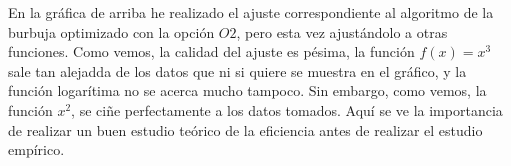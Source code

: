 \documentclass[12pt]{article}
\begin{document}
En la gráfica de arriba he realizado el ajuste correspondiente al algoritmo de la burbuja optimizado con la opción $O2$, pero esta vez ajustándolo a otras funciones. Como vemos, la calidad del ajuste es pésima, la función $f(x)=x^3$ sale tan alejadda de los datos que ni si quiere se muestra en el gráfico, y la función logarítima no se acerca mucho tampoco. Sin embargo, como vemos, la función $x^2$, se ciñe perfectamente a los datos tomados. Aquí se ve la importancia de realizar un buen estudio teórico de la eficiencia antes de realizar el estudio empírico.
\end{document}
